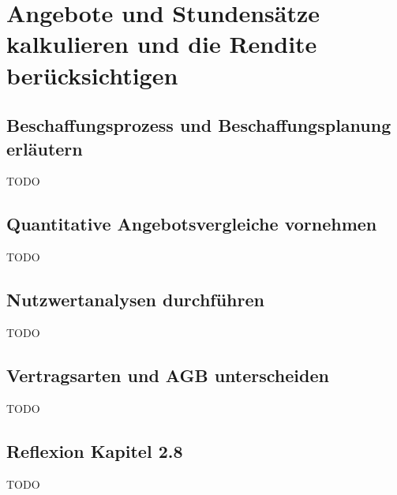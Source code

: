 \section{Angebote und Stundensätze kalkulieren und die Rendite berücksichtigen}
\subsection{Beschaffungsprozess und Beschaffungsplanung erläutern}
    TODO
\subsection{Quantitative Angebotsvergleiche vornehmen}
    TODO
\subsection{Nutzwertanalysen durchführen}
    TODO
\subsection{Vertragsarten und AGB unterscheiden}
    TODO
\subsection*{Reflexion Kapitel 2.8}
    \begin{refindent}
        TODO
    \end{refindent}